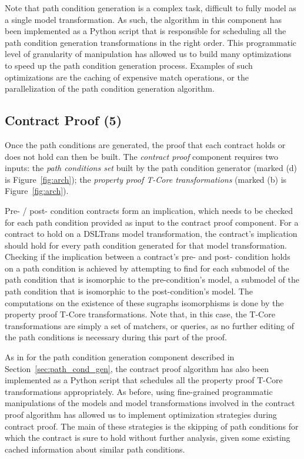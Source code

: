 Note that path condition generation is a complex task, difficult to fully
model as a single model transformation. As such, the algorithm in this component
has been implemented as a Python script that is responsible for scheduling all the
path condition generation transformations in the right order. This programmatic level of granularity of
manipulation has allowed us to build many optimizations to speed up the path
condition generation process. Examples of such optimizations are the caching of
expensive match operations, or the parallelization of the path condition generation algorithm. 
 
\subsection{Contract Proof (5)}

Once the path conditions are generated, the proof that each
contract holds or does not hold can then be built. The \emph{contract proof}
component requires two inputs: the \emph{path conditions set} built by the path
condition generator (marked (d) is Figure~\ref{fig:arch}); the \emph{property
proof T-Core transformations} (marked (b) is Figure~\ref{fig:arch}).

Pre- / post- condition contracts form an implication, which needs to be
checked for each path condition provided as input to the contract proof
component. For a contract to hold on a DSLTrans model transformation, the
contract's implication should hold for every path condition generated for
that model transformation. Checking if the implication between a contract's pre-
and post- condition holds on a path condition is achieved by attempting to find for each submodel of
the path condition that is isomorphic to the pre-condition's model, a submodel
of the path condition that is isomorphic to the post-condition's model. The
computations on the existence of these sugraphs isomorphisms is done by
the property proof T-Core transformations. Note that, in this case, the
T-Core transformations are simply a set of matchers, or queries, as no further
editing of the path conditions is necessary during this part of the proof.

As in for the path condition generation component described in
Section~\ref{sec:path_cond_gen}, the contract proof algorithm has also been
implemented as a Python script that schedules all the property proof T-Core
transformations appropriately. As before, using fine-grained programmatic
manipulations of the models and model transformations involved in the contract
proof algorithm has allowed us to implement optimization strategies during
contract proof. The main of these strategies is the skipping of path conditions
for which the contract is sure to hold without further analysis, given
some existing cached information about similar path conditions.


